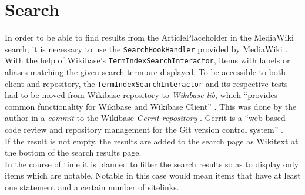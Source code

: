 \section{Search}
In order to be able to find results from the ArticlePlaceholder in the MediaWiki search, it is necessary to use the \texttt{\justify SearchHookHandler} provided by MediaWiki \citep{wiki:25}. \\
With the help of Wikibase's \texttt{\justify TermIndexSearchInteractor}, items with labels or aliases matching the given search term are displayed. To be accessible to both client and repository, the \texttt{\justify TermIndexSearchInteractor} and its respective tests had to be moved from Wikibase repository to \textit{Wikibase lib}, which ``provides common functionality for Wikibase and Wikibase Client'' \citep{wiki:28}. This was done by the author in a \textit{commit} to the Wikibase \textit{Gerrit repository} \citep{gerrit:01}. Gerrit is a ``web based code review and repository management for the Git version control system'' \citep{gerrit}.
\\
If the result is not empty, the results are added to the search page as Wikitext at the bottom of the search results page. \\
In the course of time it is planned to filter the search results so as to display only items which are notable. Notable in this case would mean items that have at least one statement and a certain number of sitelinks.
